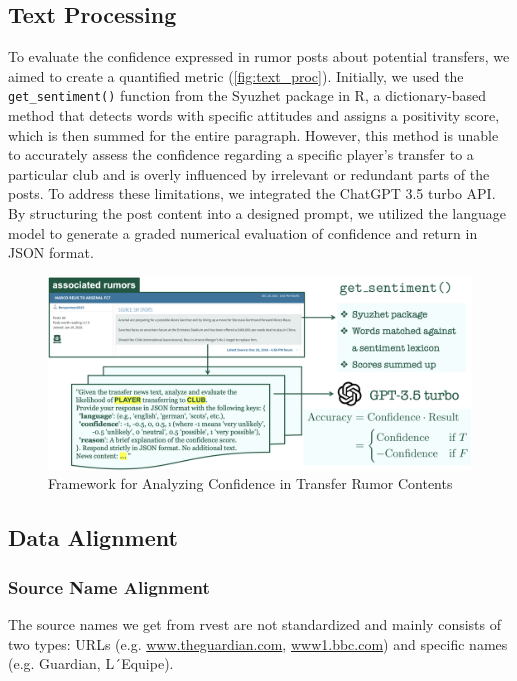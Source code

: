\subsection{Text Processing}
To evaluate the confidence expressed in rumor posts about potential transfers, we aimed to create a quantified metric (\autoref{fig:text_proc}). Initially, we used the \texttt{get\_sentiment()} function from the Syuzhet package in R, a dictionary-based method that detects words with specific attitudes and assigns a positivity score, which is then summed for the entire paragraph. However, this method is unable to accurately assess the confidence regarding a specific player's transfer to a particular club and is overly influenced by irrelevant or redundant parts of the posts. To address these limitations, we integrated the ChatGPT 3.5 turbo API. By structuring the post content into a designed prompt, we utilized the language model to generate a graded numerical evaluation of confidence and return in JSON format.
\begin{figure}[ht]
    \centering
    \includegraphics[width=.8\textwidth]{figs/text_proc.png}
    \caption{
        Framework for Analyzing Confidence in Transfer Rumor Contents
    }\label{fig:text_proc}
\end{figure}

\subsection{Data Alignment}


\subsubsection{Source Name Alignment}
The source names we get from rvest are not standardized and mainly consists of two types: URLs (e.g. \url{www.theguardian.com}, \url{www1.bbc.com}) and specific names (e.g. Guardian, L´Equipe). 


